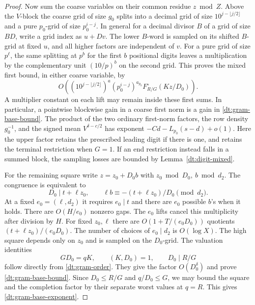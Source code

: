 \documentclass[11pt,a4paper]{article}
\theoremstyle{paperplain}
\numberwithin{equation}{section}
\begin{document}
\begin{proof}
Now sum the coarse variables on their common residue
\(z\bmod Z\). Above the \(V\)-block the coarse grid of size
\(g_0\) splits into a decimal grid of size
\(10^{j-\lfloor j/2\rfloor}\) and a pure \(p_0\)-grid of
size \(p_0^{i-j}\). In general for a decimal divisor
\(B\) of a grid of size \(B D\), write a grid index as \(u+Dv\).
The lower \(B\)-word is sampled on its shifted \(B\)-grid
at fixed \(u\), and all higher factors are independent of
\(v\). For a pure grid of size \(p^\ell\), the same splitting
at \(p^b\) for the first \(b\) positional digits leaves a
multiplication by the complementary unit \((10/p)^b\) on
the second grid. This proves the mixed first bound, in either
coarse variable, by
\begin{equation}
 O\left(
    (10^{j-\lfloor j/2\rfloor})^a
    (p_0^{i-j})^{a_{p_0}}
    F_{R/G}^\circ(Kz/D_0)\right).
 \label{dt:gram-first}
\end{equation}
A multiplier constant on each lift may remain inside these
first sums. In particular, a pointwise blockwise gain in a
coarse first norm is a gain in \eqref{dt:gram-base-bound}.
The product of the two ordinary first-norm factors, the row
density \(g_0^{-1}\), and the signed mean \(V^{\delta-c/2}\)
has exponent \(-Cd-L_{p_0}(s-d)+o(1)\).
Here the upper factor retains the prescribed leading digit
if there is one, and retains the terminal restriction when
\(G=1\). If an end restriction instead falls in a summed
block, the sampling losses are bounded by
Lemma~\ref{dt:digit-mixed}.

For the remaining square write \(z=z_0+D_0 b\) with
\(z_0\bmod D_0,\ b\bmod d_2\). The congruence is equivalent to
\begin{equation}
 D_0\mid t+\ell z_0,\qquad
 \ell b\equiv -(t+\ell z_0)/D_0\pmod{d_2}.
 \label{dt:gram-fold}
\end{equation}
At a fixed \(e_0=(\ell,d_2)\) it requires \(e_0\mid t\)
and there are \(e_0\) possible \(b\)'s when it holds.
There are \(O(H/e_0)\) nonzero gaps. The \(e_0\) lifts
cancel this multiplicity after division by \(H\).
For fixed \(z_0,\ell\) there are \(O(1+T/(e_0D_0))\)
quotients \((t+\ell z_0)/(e_0D_0)\).
The number of choices of \(e_0\mid d_2\) is \(O(\log X)\).
The high square depends only on \(z_0\) and is sampled
on the \(D_0\)-grid. The valuation identities
\begin{equation}
 GD_0=qK,\qquad (K,D_0)=1,\qquad D_0\mid R/G
 \label{dt:gram-fold-identities}
\end{equation}
follow directly from \eqref{dt:gram-order}. They give the
factor \(O(D_0^\delta)\) and prove \eqref{dt:gram-base-bound}.
Since \(D_0\le R/G\) and \(q/D_0\le G\), we may bound the
square and the completion factor by their separate worst
values at \(q=R\). This gives \eqref{dt:gram-base-exponent}.
\end{proof}
\end{document}
